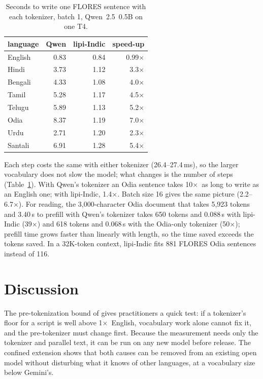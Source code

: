 \documentclass[11pt]{article}
\newcommand{\x}{$\times$}
\begin{document}
\begin{table}[t]
\centering
\small
\begin{tabular}{lrrr}
\toprule
language & Qwen & lipi-Indic & speed-up \\
\midrule
English & 0.83 & 0.84 & 0.99\x \\
Hindi & 3.73 & 1.12 & 3.3\x \\
Bengali & 4.33 & 1.08 & 4.0\x \\
Tamil & 5.28 & 1.17 & 4.5\x \\
Telugu & 5.89 & 1.13 & 5.2\x \\
Odia & 8.37 & 1.19 & 7.0\x \\
Urdu & 2.71 & 1.20 & 2.3\x \\
Santali & 6.91 & 1.28 & 5.4\x \\
\bottomrule
\end{tabular}
\caption{Seconds to write one FLORES sentence with each tokenizer, batch 1, Qwen~2.5~0.5B on one T4.}
\label{tab:speed}
\end{table}

Each step costs the same with either tokenizer (26.4--27.4\,ms), so the larger vocabulary does not
slow the model; what changes is the number of steps (Table~\ref{tab:speed}). With Qwen's tokenizer an
Odia sentence takes 10\x\ as long to write as an English one; with lipi-Indic, 1.4\x. Batch size 16
gives the same picture (2.2--6.7\x). For reading, the 3,000-character Odia document that takes 5,923
tokens and 3.40\,s to prefill with Qwen's tokenizer takes 650 tokens and 0.088\,s with lipi-Indic
(39\x) and 618 tokens and 0.068\,s with the Odia-only tokenizer (50\x); prefill time grows faster
than linearly with length, so the time saved exceeds the tokens saved. In a 32K-token context,
lipi-Indic fits 881 FLORES Odia sentences instead of 116.

\section{Discussion}

The pre-tokenization bound of \citet{regmi2026vowel} gives practitioners a quick test: if a
tokenizer's floor for a script is well above 1\x\ English, vocabulary work alone cannot fix it, and
the pre-tokenizer must change first. Because the
measurement needs only the tokenizer and parallel text, it can be run on any new model before
release. The confined extension shows that both causes can be removed from an existing open model
without disturbing what it knows of other languages, at a vocabulary size below Gemini's.
\end{document}
